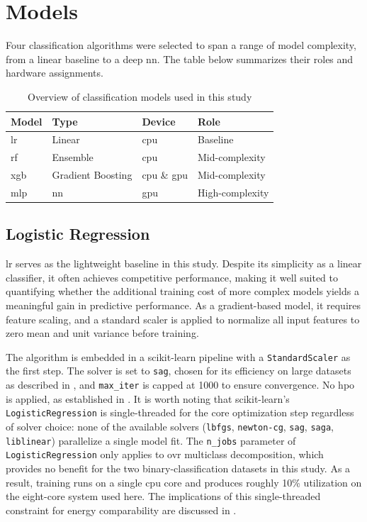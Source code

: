 \section{Models}
\label{design_models}

Four classification algorithms were selected to span a range of model complexity, from a linear baseline to a deep \gls{nn}. The table below summarizes their roles and hardware assignments.

\begin{table}[htbp]
\centering
\caption{Overview of classification models used in this study}
\label{tab:models}
\begin{tabular}{llll}
\toprule
\textbf{Model} & \textbf{Type} & \textbf{Device} & \textbf{Role} \\
\midrule
\gls{lr} & Linear & \gls{cpu} & Baseline \\
\gls{rf}  & Ensemble & \gls{cpu} & Mid-complexity \\
\gls{xgb} & Gradient Boosting & \gls{cpu} \& \gls{gpu} & Mid-complexity \\
\gls{mlp} & \gls{nn} & \gls{gpu} & High-complexity \\
\bottomrule
\end{tabular}
\end{table}

\subsection{Logistic Regression}
\label{implementation_lr}

\gls{lr} serves as the lightweight baseline in this study. Despite its simplicity as a linear classifier, it often achieves competitive performance, making it well suited to quantifying whether the additional training cost of more complex models yields a meaningful gain in predictive performance. As a gradient-based model, it requires feature scaling, and a standard scaler is applied to normalize all input features to zero mean and unit variance before training.

The algorithm is embedded in a scikit-learn pipeline with a \texttt{StandardScaler} as the first step. The solver is set to \texttt{sag}, chosen for its efficiency on large datasets as described in , and \texttt{max\_iter} is capped at 1000 to ensure convergence. No \gls{hpo} is applied, as established in . It is worth noting that scikit-learn's \texttt{LogisticRegression} is single-threaded for the core optimization step regardless of solver choice: none of the available solvers (\texttt{lbfgs}, \texttt{newton-cg}, \texttt{sag}, \texttt{saga}, \texttt{liblinear}) parallelize a single model fit. The \texttt{n\_jobs} parameter of \texttt{LogisticRegression} only applies to \gls{ovr} multiclass decomposition, which provides no benefit for the two binary-classification datasets in this study. As a result, training runs on a single \gls{cpu} core and produces roughly 10\% utilization on the eight-core system used here. The implications of this single-threaded constraint for energy comparability are discussed in .

